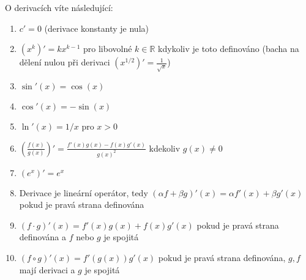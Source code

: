 \begin{theorem}
	O derivacích víte následující:
	\begin{enumerate}
		\item  $c' = 0$ (derivace konstanty je nula) \label{poucka:derivace_konstanty}
		\item  $(x^k)' = k x^{k-1}$ pro libovolné $k \in \mathbb{R}$ kdykoliv je toto definováno (bacha na dělení nulou při derivaci $(x^{1/2})' = \frac{1}{\sqrt{x}}$) \label{poucka:derivace_monomu}
		\item  $\sin'(x) = \cos(x)$ \label{poucka:derivace_sin}
		\item  $\cos'(x) = -\sin(x)$ \label{poucka:derivace_cos}
		\item  $\ln'(x) = 1/x$ pro $x>0$ \label{poucka:derivace_ln}
		\item  $\left( \frac{f(x)}{g(x)} \right)' = \frac{f'(x)g(x) - f(x)g'(x)}{g(x)^2}$ kdekoliv $g(x) \neq 0$
		\item  $(e^x)' = e^x$ \label{poucka:derivace_exponencialy}
		\item  Derivace je lineární operátor, tedy $(\alpha f + \beta g)'(x) = \alpha f'(x) + \beta g'(x)$ pokud je pravá strana definována \label{poucka:derivace_je_linearni_operator}
		\item  $(f\cdot g)'(x) = f'(x) g(x) + f(x) g'(x)$ pokud je pravá strana definována a $f$ nebo $g$ je spojitá \label{poucka:derivace_soucinu}
		\item  $(f\circ g)'(x) = f'(g(x)) g'(x)$ pokud je pravá strana definována, $g, f$ mají derivaci a $g$ je spojitá \label{poucka:derivace_slozene_fce}
	\end{enumerate}
	\label{thm:poucky_o_derivacich}
\end{theorem}

